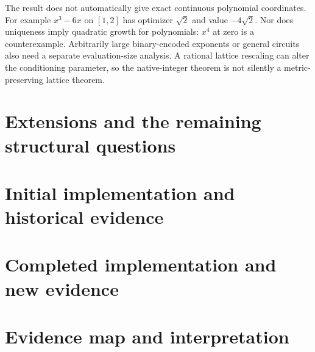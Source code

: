 \documentclass[11pt]{article}
\theoremstyle{remark}
\begin{document}
The result does not automatically give exact continuous polynomial
coordinates. For example $x^3-6x$ on $[1,2]$ has optimizer $\sqrt2$ and
value $-4\sqrt2$. Nor does uniqueness imply quadratic growth for
polynomials: $x^4$ at zero is a counterexample. Arbitrarily large
binary-encoded exponents or general circuits also need a separate
evaluation-size analysis. A rational lattice rescaling can alter the
conditioning parameter, so the native-integer theorem is not silently a
metric-preserving lattice theorem.

\section{Extensions and the remaining structural questions}\label{sec:extensions}


\section{Initial implementation and historical evidence}\label{sec:computation}


\section{Completed implementation and new evidence}\label{sec:completion}


\section{Evidence map and interpretation}\label{sec:evidence}




\end{document}
